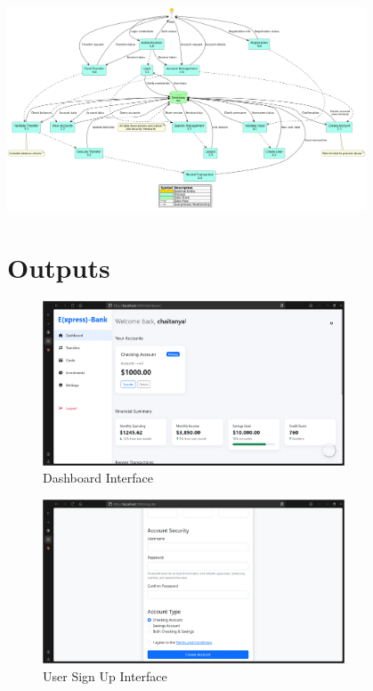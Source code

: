 \includegraphics[width=0.8\textwidth, height=0.7\textheight, angle=90]{dataflow.png}

\chapter{Outputs}

\begin{figure}[h]
    \centering
    \includegraphics[width=0.8\textwidth]{dashboard.png}
    \caption{Dashboard Interface}
\end{figure}

\begin{figure}[h]
    \centering
    \includegraphics[width=0.8\textwidth]{register.png}
    \caption{User Sign Up Interface}
\end{figure}

